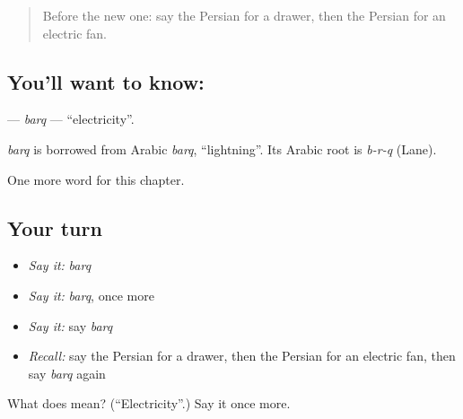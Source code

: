 \begin{quote}
Before the new one: say the Persian for a drawer, then the Persian for an electric fan.
\end{quote}

\subsection*{You'll want to know: }
\textbf{} — \emph{barq} — \textquotedblleft{}electricity\textquotedblright{}.

\begin{cousinweb}
\emph{barq} is borrowed from Arabic \emph{barq}, \textquotedblleft{}lightning\textquotedblright{}. Its Arabic root is \emph{b-r-q} (Lane).
\end{cousinweb}

\begin{grammarlens}[title={What you've built}]
One more word for this chapter.
\end{grammarlens}

\subsection*{Your turn}
\begin{itemize}
\raggedright
  \item \emph{Say it:} \emph{barq}
  \item \emph{Say it:} \emph{barq}, once more
  \item \emph{Say it:} say \emph{barq}
  \item \emph{Recall:} say the Persian for a drawer, then the Persian for an electric fan, then say \emph{barq} again
\end{itemize}

\begin{tcolorbox}[breakable,colback=teal!4,colframe=teal!35!black,title={Before you move on}]
What does  mean? (\textquotedblleft{}Electricity\textquotedblright{}.) Say it once more.
\end{tcolorbox}
